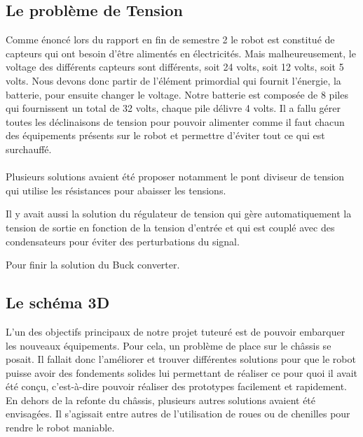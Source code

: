 \subsection{Le problème de Tension}

Comme énoncé lors du rapport en fin de semestre 2 le robot est constitué de capteurs qui ont besoin d’être alimentés en électricités. Mais malheureusement, le voltage des différents capteurs sont différents, soit 24 volts, soit 12 volts, soit 5 volts.
Nous devons donc partir de l’élément primordial qui fournit l’énergie, la batterie, pour ensuite changer le voltage. Notre batterie est composée de 8 piles qui fournissent un total de 32 volts, chaque pile délivre 4 volts.
Il a fallu gérer toutes les déclinaisons de tension pour pouvoir alimenter comme il faut chacun des équipements présents sur le robot et permettre d'éviter tout ce qui est surchauffé.\\ \\

Plusieurs solutions avaient été proposer notamment le pont diviseur de tension qui utilise les résistances pour abaisser les tensions.


Il y avait aussi la solution du régulateur de tension qui gère automatiquement la tension de sortie en fonction de la tension d’entrée et qui est couplé avec des condensateurs pour éviter des perturbations du signal.


Pour finir la solution du Buck converter.


\subsection{Le schéma 3D}

L’un des objectifs principaux de notre projet tuteuré est de pouvoir embarquer les nouveaux équipements. Pour cela, un problème de place sur le châssis se posait. Il fallait donc l’améliorer et trouver différentes solutions pour que le robot puisse avoir des fondements solides lui permettant de réaliser ce pour quoi il avait été conçu, c'est-à-dire pouvoir réaliser des prototypes facilement et rapidement.
En dehors de la refonte du châssis, plusieurs autres solutions avaient été envisagées. Il s’agissait entre autres de l’utilisation de roues ou de chenilles pour rendre le robot maniable.

